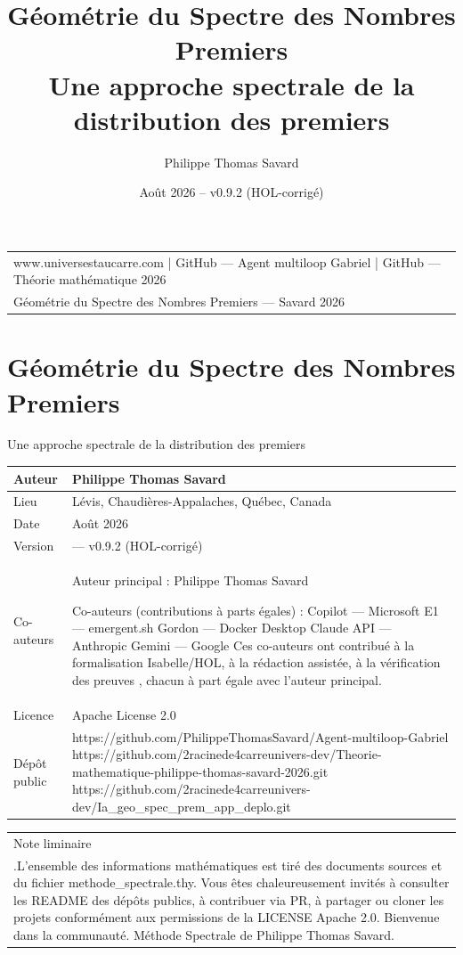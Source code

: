 \documentclass[11pt,a4paper]{article}
\title{\textbf{Géométrie du Spectre des Nombres Premiers}\\[0.3em]
\large Une approche spectrale de la distribution des premiers}
\author{Philippe Thomas Savard}
\date{Août 2026 -- v0.9.2 (HOL-corrigé)}
\begin{document}
\maketitle
\tableofcontents
\newpage


\begin{longtable}{|p{}|}
\hline
www.universestaucarre.com | GitHub — Agent multiloop Gabriel | GitHub — Théorie mathématique 2026 \\ Géométrie du Spectre des Nombres Premiers — Savard 2026 \\
\hline
\end{longtable}


\section{Géométrie du Spectre des Nombres Premiers}
Une approche spectrale de la distribution des premiers


\begin{longtable}{|p{}|p{}|}
\hline
Auteur & Philippe Thomas Savard \\
\hline
Lieu & Lévis, Chaudières-Appalaches, Québec, Canada \\
\hline
Date & Août 2026 \\
\hline
Version & — v0.9.2 (HOL-corrigé) \\
\hline
Co-auteurs & Auteur principal : Philippe Thomas Savard

 Co-auteurs (contributions à parts égales) :
 Copilot — Microsoft E1 — emergent.sh Gordon — Docker Desktop Claude API — Anthropic Gemini — Google Ces co-auteurs ont contribué à la formalisation Isabelle/HOL, à la rédaction assistée, à la vérification des preuves , chacun à part égale avec l'auteur principal. \\
\hline
Licence & Apache License 2.0 \\
\hline
Dépôt public & https://github.com/PhilippeThomasSavard/Agent-multiloop-Gabriel
https://github.com/2racinede4carreunivers-dev/Theorie-mathematique-philippe-thomas-savard-2026.git
https://github.com/2racinede4carreunivers-dev/Ia_geo_spec_prem_app_deplo.git \\
\hline
\end{longtable}




\begin{longtable}{|p{}|}
\hline
Note liminaire \\ .L’ensemble des informations mathématiques est tiré des documents sources et du fichier methode_spectrale.thy. Vous êtes chaleureusement invités à consulter les README des dépôts publics, à contribuer via PR, à partager ou cloner les projets conformément aux permissions de la LICENSE Apache 2.0. Bienvenue dans la communauté. Méthode Spectrale de Philippe Thomas Savard. \\
\hline
\end{longtable}
\end{document}
